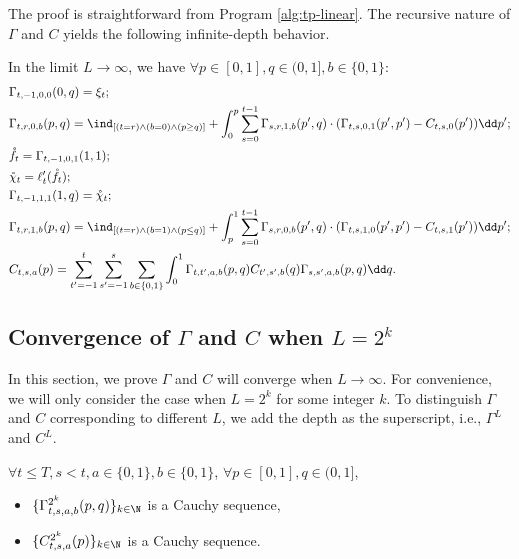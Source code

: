 The proof is straightforward from Program \ref{alg:tp-linear}. The recursive nature of $\Gamma$ and $C$ yields the following infinite-depth behavior.

\begin{prop} \label{prop:infinite_depth_linear_formal}
In the limit $L\to \infty$, we  have $\forall p\in [0, 1], q\in (0,1], b\in\{0, 1\}$:
\begin{align*}
    & \Gamma_{t,-1,0,0}(0, q)=\xi_t; \\
  & \Gamma_{t,r,0,b}(p, q)=\ind_{[(t=r) \wedge (b=0) \wedge (p\geq q)]} + \int_0^p \sum_{s=0}^{t-1}\Gamma_{s,r,1,b}(p',q)\cdot (\Gamma_{t,s,0,1}(p', p')- C_{t,s,0}(p'))\dd p'; \\
     & \mathring f_t = \Gamma_{t,-1,0,1}(1, 1);\\
     & \mathring \chi_t = \ell'_t(\mathring f_t); \\
     & \Gamma_{t,-1,1,1}(1,q)=\mathring \chi_t; \\
     & \Gamma_{t,r,1,b}(p, q) = \ind_{[(t=r) \wedge (b=1) \wedge (p\leq q)]} + \int_p^1 \sum_{s=0}^{t-1} \Gamma_{s,r,0,b}(p',q) \cdot (\Gamma_{t,s,1,0}(p',p') - C_{t,s,1}(p'))\dd p';\\
     & C_{t,s,a}(p)=\sum_{t'=-1}^{t}\sum_{s'=-1}^{s}\sum_{b\in\{0,1\}}\int_0^1 \Gamma_{t,t',a,b}(p,q) C_{t',s',b}(q)\Gamma_{s,s',a,b}(p,q) \dd q.
\end{align*}
\end{prop}

\subsection{Convergence of $\Gamma$ and $C$ when $L=2^k$}

In this section, we prove $\Gamma$ and $C$ will converge when $L\to\infty$. For convenience, we will only consider the case when $L=2^k$ for some integer $k$. To distinguish $\Gamma$ and $C$ corresponding to different $L$, we add the depth as the superscript, i.e., $\Gamma^L$ and $C^L$.

\begin{thm}
    $\forall t\leq T,s<t, a\in \{0,1\}, b\in \{0, 1\}$, $\forall p\in [0, 1], q\in (0,1]$, 
    \begin{itemize}
        \item $\{\Gamma^{2^k}_{t,s,a,b}(p,q)\}_{k\in \N}$ is a Cauchy sequence, 
        \item $\{C^{2^k}_{t,s,a}(p)\}_{k\in \N}$ is a Cauchy sequence.
    \end{itemize}
\end{thm}

